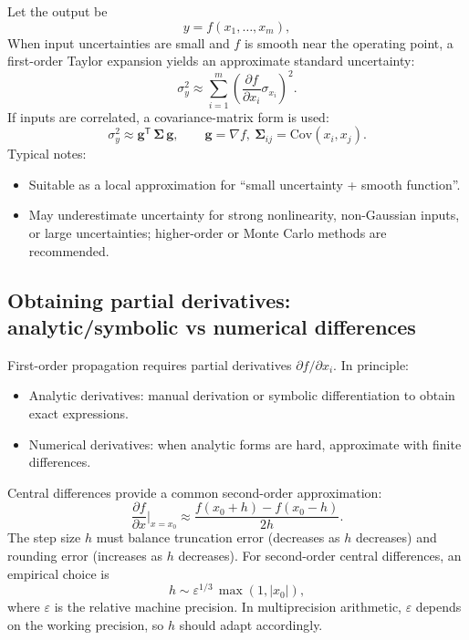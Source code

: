 \documentclass[a4paper,11pt]{article}
\begin{document}
Let the output be
\begin{equation}
y=f(x_1,\ldots,x_m),
\end{equation}
When input uncertainties are small and $f$ is smooth near the operating point, a first-order Taylor expansion yields an approximate standard uncertainty:
\begin{equation}
\sigma_y^2 \approx \sum_{i=1}^{m}\left(\frac{\partial f}{\partial x_i}\sigma_{x_i}\right)^2.
\end{equation}
If inputs are correlated, a covariance-matrix form is used:
\begin{equation}
\sigma_y^2 \approx \bm{g}^\mathsf{T}\,\bm{\Sigma}\,\bm{g},\qquad
\bm{g}=\nabla f,\ \bm{\Sigma}_{ij}=\mathrm{Cov}(x_i,x_j).
\end{equation}
Typical notes:
\begin{itemize}
  \item Suitable as a local approximation for ``small uncertainty + smooth function''.
  \item May underestimate uncertainty for strong nonlinearity, non-Gaussian inputs, or large uncertainties; higher-order or Monte Carlo methods are recommended.
\end{itemize}

\subsection{Obtaining partial derivatives: analytic/symbolic vs numerical differences}

First-order propagation requires partial derivatives $\partial f/\partial x_i$. In principle:
\begin{itemize}
  \item Analytic derivatives: manual derivation or symbolic differentiation to obtain exact expressions.
  \item Numerical derivatives: when analytic forms are hard, approximate with finite differences.
\end{itemize}

Central differences provide a common second-order approximation:
\begin{equation}
\frac{\partial f}{\partial x}\bigg|_{x=x_0}\approx \frac{f(x_0+h)-f(x_0-h)}{2h}.
\end{equation}
The step size $h$ must balance truncation error (decreases as $h$ decreases) and rounding error (increases as $h$ decreases). For second-order central differences, an empirical choice is
\begin{equation}
h \sim \varepsilon^{1/3}\,\max(1,|x_0|),
\end{equation}
where $\varepsilon$ is the relative machine precision. In multiprecision arithmetic, $\varepsilon$ depends on the working precision, so $h$ should adapt accordingly.
\end{document}
